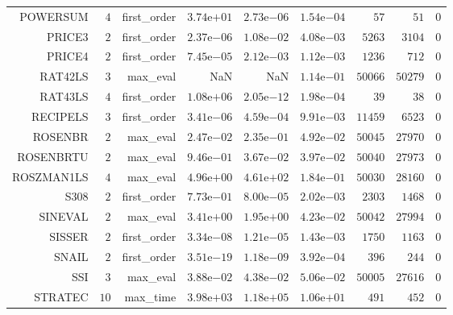 \begin{longtable}{rrrrrrrrr}
POWERSUM & \(     4\) & first\_order & \( 3.74\)e\(+01\) & \( 2.73\)e\(-06\) & \( 1.54\)e\(-04\) & \(    57\) & \(    51\) & \(     0\) \\
PRICE3 & \(     2\) & first\_order & \( 2.37\)e\(-06\) & \( 1.08\)e\(-02\) & \( 4.08\)e\(-03\) & \(  5263\) & \(  3104\) & \(     0\) \\
PRICE4 & \(     2\) & first\_order & \( 7.45\)e\(-05\) & \( 2.12\)e\(-03\) & \( 1.12\)e\(-03\) & \(  1236\) & \(   712\) & \(     0\) \\
RAT42LS & \(     3\) & max\_eval &       NaN &       NaN & \( 1.14\)e\(-01\) & \( 50066\) & \( 50279\) & \(     0\) \\
RAT43LS & \(     4\) & first\_order & \( 1.08\)e\(+06\) & \( 2.05\)e\(-12\) & \( 1.98\)e\(-04\) & \(    39\) & \(    38\) & \(     0\) \\
RECIPELS & \(     3\) & first\_order & \( 3.41\)e\(-06\) & \( 4.59\)e\(-04\) & \( 9.91\)e\(-03\) & \( 11459\) & \(  6523\) & \(     0\) \\
ROSENBR & \(     2\) & max\_eval & \( 2.47\)e\(-02\) & \( 2.35\)e\(-01\) & \( 4.92\)e\(-02\) & \( 50045\) & \( 27970\) & \(     0\) \\
ROSENBRTU & \(     2\) & max\_eval & \( 9.46\)e\(-01\) & \( 3.67\)e\(-02\) & \( 3.97\)e\(-02\) & \( 50040\) & \( 27973\) & \(     0\) \\
ROSZMAN1LS & \(     4\) & max\_eval & \( 4.96\)e\(+00\) & \( 4.61\)e\(+02\) & \( 1.84\)e\(-01\) & \( 50030\) & \( 28160\) & \(     0\) \\
S308 & \(     2\) & first\_order & \( 7.73\)e\(-01\) & \( 8.00\)e\(-05\) & \( 2.02\)e\(-03\) & \(  2303\) & \(  1468\) & \(     0\) \\
SINEVAL & \(     2\) & max\_eval & \( 3.41\)e\(+00\) & \( 1.95\)e\(+00\) & \( 4.23\)e\(-02\) & \( 50042\) & \( 27994\) & \(     0\) \\
SISSER & \(     2\) & first\_order & \( 3.34\)e\(-08\) & \( 1.21\)e\(-05\) & \( 1.43\)e\(-03\) & \(  1750\) & \(  1163\) & \(     0\) \\
SNAIL & \(     2\) & first\_order & \( 3.51\)e\(-19\) & \( 1.18\)e\(-09\) & \( 3.92\)e\(-04\) & \(   396\) & \(   244\) & \(     0\) \\
SSI & \(     3\) & max\_eval & \( 3.88\)e\(-02\) & \( 4.38\)e\(-02\) & \( 5.06\)e\(-02\) & \( 50005\) & \( 27616\) & \(     0\) \\
STRATEC & \(    10\) & max\_time & \( 3.98\)e\(+03\) & \( 1.18\)e\(+05\) & \( 1.06\)e\(+01\) & \(   491\) & \(   452\) & \(     0\) \\

\end{longtable}
